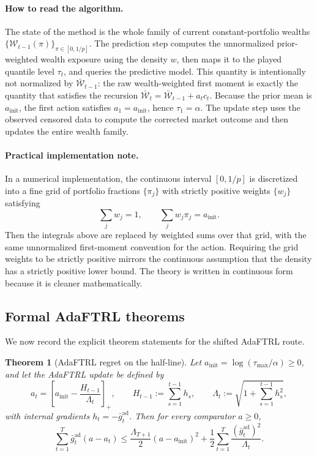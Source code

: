 \documentclass[11pt]{article}
\newtheorem{theorem}{Theorem}
\newcommand{\1}{\mathbf{1}}
\begin{document}
\paragraph{How to read the algorithm.}
The state of the method is the whole family of current constant-portfolio wealths $\{\mathcal W_{t-1}(\pi)\}_{\pi\in[0,1/p]}$. The prediction step computes the unnormalized prior-weighted wealth exposure using the density \(w\), then maps it to the played quantile level \(\tau_t\), and queries the predictive model. This quantity is intentionally not normalized by \(\bar{\mathcal W}_{t-1}\): the raw wealth-weighted first moment is exactly the quantity that satisfies the recursion \(\bar{\mathcal W}_t=\bar{\mathcal W}_{t-1}+a_t c_t\). Because the prior mean is \(a_{\mathrm{init}}\), the first action satisfies \(a_1=a_{\mathrm{init}}\), hence \(\tau_1=\alpha\). The update step uses the observed censored data to compute the corrected market outcome and then updates the entire wealth family.

\paragraph{Practical implementation note.}
In a numerical implementation, the continuous interval $[0,1/p]$ is discretized into a fine grid of portfolio fractions \(\{\pi_j\}\) with strictly positive weights \(\{w_j\}\) satisfying
\[
\sum_j w_j=1,
\qquad
\sum_j w_j\pi_j=a_{\mathrm{init}}.
\]
Then the integrals above are replaced by weighted sums over that grid, with the same unnormalized first-moment convention for the action. Requiring the grid weights to be strictly positive mirrors the continuous assumption that the density has a strictly positive lower bound. The theory is written in continuous form because it is cleaner mathematically.


\subsection{Formal AdaFTRL theorems}

We now record the explicit theorem statements for the shifted AdaFTRL route.

\begin{theorem}[AdaFTRL regret on the half-line]
\label{thm:adaftrl-regret-main}
Let \(a_{\mathrm{init}}=\log(\tau_{\max}/\alpha)\ge 0\), and let the AdaFTRL update be defined by
\[
a_t=\left[a_{\mathrm{init}}-\frac{H_{t-1}}{\Lambda_t}\right]_+,
\qquad
H_{t-1}:=\sum_{s=1}^{t-1}h_s,
\qquad
\Lambda_t:=\sqrt{1+\sum_{s=1}^{t-1}h_s^2},
\]
with internal gradients \(h_t=-\bar g_t^{\mathrm{ad}}\). Then for every comparator \(a\ge 0\),
\[
\sum_{t=1}^T \bar g_t^{\mathrm{ad}}(a-a_t)
\le
\frac{\Lambda_{T+1}}{2}(a-a_{\mathrm{init}})^2+\frac12\sum_{t=1}^T\frac{(\bar g_t^{\mathrm{ad}})^2}{\Lambda_t}.
\]
\end{theorem}
\end{document}
